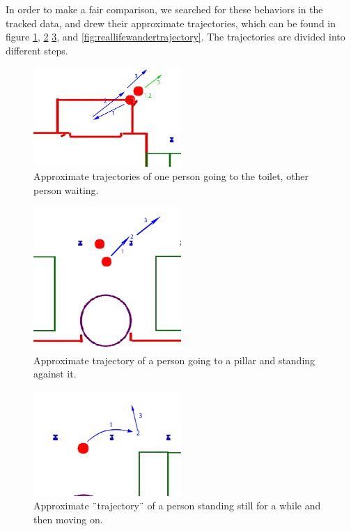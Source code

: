 \documentclass[11pt, a4paper]{book}
\begin{document}
In order to make a fair comparison, we searched for these behaviors in the tracked data, and drew their approximate trajectories, which can be found in figure \ref{fig:reallifetoilettrajectory}, \ref{fig:reallifepillartrajectory} \ref{fig:reallifestandstilltrajectory}, and \ref{fig:reallifewandertrajectory}. The trajectories are divided into different steps.

\begin{figure}
\centering
\includegraphics[width=0.5\textwidth]{"./qualitative experiment pictures/zoomed_in_toiletsituation_reallife"}
\caption{Approximate trajectories of one person going to the toilet, other person waiting.}
\label{fig:reallifetoilettrajectory}
\end{figure}
\begin{figure}
\centering
\includegraphics[width=0.5\textwidth]{"./qualitative experiment pictures/zoomed_in_leanagainstpillar_reallife"}
\caption{Approximate trajectory of a person going to a pillar and standing against it.}
\label{fig:reallifepillartrajectory}
\end{figure}
\begin{figure}
\centering
\includegraphics[width=0.5\textwidth]{"./qualitative experiment pictures/zoomed_in_standstill_reallife"}
\caption{Approximate ¨trajectory¨ of a person standing still for a while and then moving on.}
\label{fig:reallifestandstilltrajectory}
\end{figure}
\end{document}
